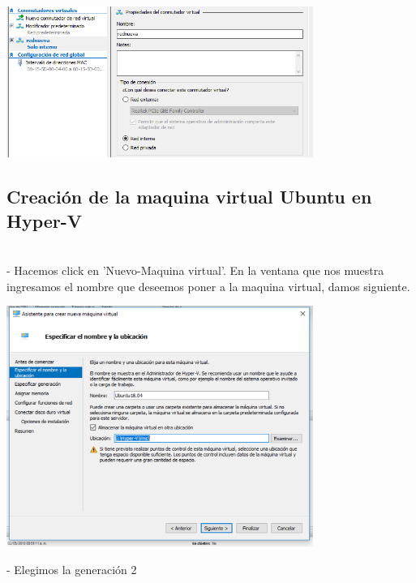 \documentclass[12pt,letterpaper]{article}
\begin{document}
\begin{center}
	\includegraphics[width=10cm]{./Imagenes/4} 
\end{center}


\begin{itemize}

\subsection{Creación de la maquina virtual Ubuntu en Hyper-V}\\
- Hacemos click en 'Nuevo-Maquina virtual'. En la ventana que nos muestra ingresamos el nombre que deseemos poner a la maquina virtual, damos siguiente.
\end{itemize}

\begin{center}
	\includegraphics[width=10cm]{./Imagenes/7} 
\end{center}



\begin{itemize}
- Elegimos la generación 2\\
\end{itemize}
\end{document}

